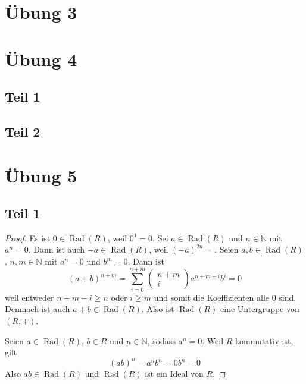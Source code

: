 \documentclass[10pt,a4paper]{article}
\DeclareMathOperator{\rad}{Rad}
\begin{document}
\section{Übung 3}

\section{Übung 4}

\subsection{Teil 1}

\subsection{Teil 2}

\section{Übung 5}

\subsection{Teil 1}

\begin{proof}
  Es ist $0 \in \rad(R)$, weil $0^{1} = 0$.
  Sei $a \in \rad(R)$ und $n \in \mathbb{N}$ mit $a^{n} = 0$.
  Dann ist auch $-a \in \rad(R)$, weil $(-a)^{2n} = $.
  Seien $a, b \in \rad(R)$, $n, m \in \mathbb{N}$ mit $a^{n} = 0$ und $b^{m} = 0$.
  Dann ist
  \begin{equation}
    (a + b)^{n + m} = \sum_{i = 0}^{n + m} \begin{pmatrix}n + m\\i\end{pmatrix} a^{n + m - i}b^{i} = 0
  \end{equation}
  weil entweder $n + m - i \ge n$ oder $i \ge m$ und somit die Koeffizienten alle $0$ sind.
  Demnach ist auch $a + b \in \rad(R)$.
  Also ist $\rad(R)$ eine Untergruppe von $(R, +)$.

  Seien $a \in \rad(R)$, $b \in R$ und $n \in \mathbb{N}$, sodass $a^{n} = 0$.
  Weil $R$ kommutativ ist, gilt
  \begin{equation}
    (ab)^{n} = a^{n}b^{n} = 0b^{n} = 0
  \end{equation}
  Also $ab \in \rad(R)$ und $\rad(R)$ ist ein Ideal von $R$.
\end{proof}
\end{document}
